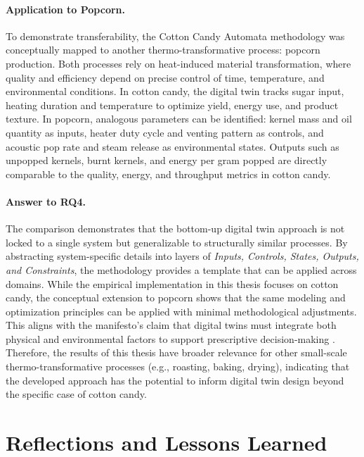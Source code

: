     
\paragraph{Application to Popcorn.}
To demonstrate transferability, the Cotton Candy Automata methodology was conceptually mapped to another thermo-transformative process: popcorn production. Both processes rely on heat-induced material transformation, where quality and efficiency depend on precise control of time, temperature, and environmental conditions. In cotton candy, the digital twin tracks sugar input, heating duration and temperature to optimize yield, energy use, and product texture. In popcorn, analogous parameters can be identified: kernel mass and oil quantity as inputs, heater duty cycle and venting pattern as controls, and acoustic pop rate and steam release as environmental states. Outputs such as unpopped kernels, burnt kernels, and energy per gram popped are directly comparable to the quality, energy, and throughput metrics in cotton candy.

\paragraph{Answer to RQ4.}
The comparison demonstrates that the bottom-up digital twin approach is not locked to a single system but generalizable to structurally similar processes. By abstracting system-specific details into layers of \textit{Inputs, Controls, States, Outputs, and Constraints}, the methodology provides a template that can be applied across domains. While the empirical implementation in this thesis focuses on cotton candy, the conceptual extension to popcorn shows that the same modeling and optimization principles can be applied with minimal methodological adjustments. This aligns with the manifesto’s claim that digital twins must integrate both physical and environmental factors to support prescriptive decision-making \parencite{FORNARI2025101477}. Therefore, the results of this thesis have broader relevance for other small-scale thermo-transformative processes (e.g., roasting, baking, drying), indicating that the developed approach has the potential to inform digital twin design beyond the specific case of cotton candy.

\section{Reflections and Lessons Learned}
\label{sec:discussion:lessons}

